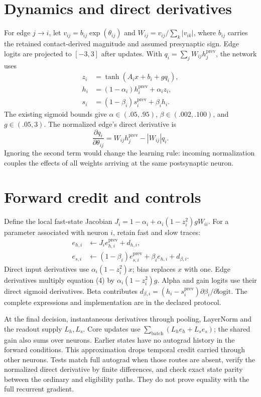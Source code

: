 \documentclass[10pt]{article}
\begin{document}
\section{Dynamics and direct derivatives}
For edge $j\to i$, let $v_{ij}=b_{ij}\exp(\theta_{ij})$ and
$W_{ij}=v_{ij}/\sum_k|v_{ik}|$, where $b_{ij}$ carries the retained contact-derived
magnitude and assumed presynaptic sign. Edge logits are projected to $[-3,3]$
after updates. With $q_i=\sum_j W_{ij}h_j^{\mathrm{prev}}$, the network uses
\begin{align}
z_i &= \tanh(A_i x+b_i+gq_i),\\
h_i &= (1-\alpha_i)h_i^{\mathrm{prev}}+\alpha_i z_i,\\
s_i &= (1-\beta_i)s_i^{\mathrm{prev}}+\beta_i h_i.
\end{align}
The existing sigmoid bounds give $\alpha\in(.05,.95)$, $\beta\in(.002,.100)$,
and $g\in(.05,3)$. The normalized edge's direct derivative is
\begin{equation}
\frac{\partial q_i}{\partial\theta_{ij}}
=W_{ij}h_j^{\mathrm{prev}}-|W_{ij}|q_i.
\end{equation}
Ignoring the second term would change the learning rule: incoming normalization
couples the effects of all weights arriving at the same postsynaptic neuron.

\newpage
\section{Forward credit and controls}
Define the local fast-state Jacobian
$J_i=1-\alpha_i+\alpha_i(1-z_i^2)gW_{ii}$. For a parameter associated with
neuron $i$, retain fast and slow traces:
\begin{align}
e_{h,i} &\leftarrow J_i e_{h,i}^{\mathrm{prev}}+d_{h,i},\\
e_{s,i} &\leftarrow (1-\beta_i)e_{s,i}^{\mathrm{prev}}+\beta_i e_{h,i}+d_{\beta,i}.
\end{align}
Direct input derivatives use $\alpha_i(1-z_i^2)x$; bias replaces $x$ with one.
Edge derivatives multiply equation (4) by $\alpha_i(1-z_i^2)g$. Alpha and gain
logits use their direct sigmoid derivatives. Beta contributes
$d_{\beta,i}=(h_i-s_i^{\mathrm{prev}})\partial\beta_i/\partial\mathrm{logit}$.
The complete expressions and implementation are in the declared protocol.

At the final decision, instantaneous derivatives through pooling, LayerNorm and
the readout supply $L_h,L_s$. Core updates use $\sum_{\mathrm{batch}}(L_he_h+L_se_s)$;
the shared gain also sums over neurons. Earlier states have no autograd history
in the forward conditions. This approximation drops temporal credit carried
through other neurons. Tests match full autograd when those routes are absent,
verify the normalized direct derivative by finite differences, and check exact
state parity between the ordinary and eligibility paths. They do not prove
equality with the full recurrent gradient.
\end{document}
